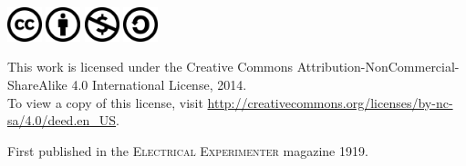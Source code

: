 \documentclass[a4paper,12pt,english,twoside,openright]{memoir}
\begin{document}
	\nocite{*}
	\frontmatter
\thispagestyle{empty}


\thispagestyle{empty}
{
	\centering\normalsize
	
	\includegraphics[width=1cm]{cc-large.png}\hspace{1em}
	\includegraphics[width=1cm]{by-large.png}\hspace{1em}
	\includegraphics[width=1cm]{nc-large.png}\hspace{1em}
	\includegraphics[width=1cm]{sa-large.png}
	
	\bigskip
	
	This work is licensed under the Creative Commons Attribution-NonCommercial-ShareAlike 4.0 International License, 2014. \\
	To view a copy of this license, visit \url{http://creativecommons.org/licenses/by-nc-sa/4.0/deed.en_US}.
	
	\bigskip
	
	{\small First published in the \textsc{Electrical Experimenter} magazine 1919.} 
	\par	
}


\newpage
\clearforchapter
	
\end{document}
